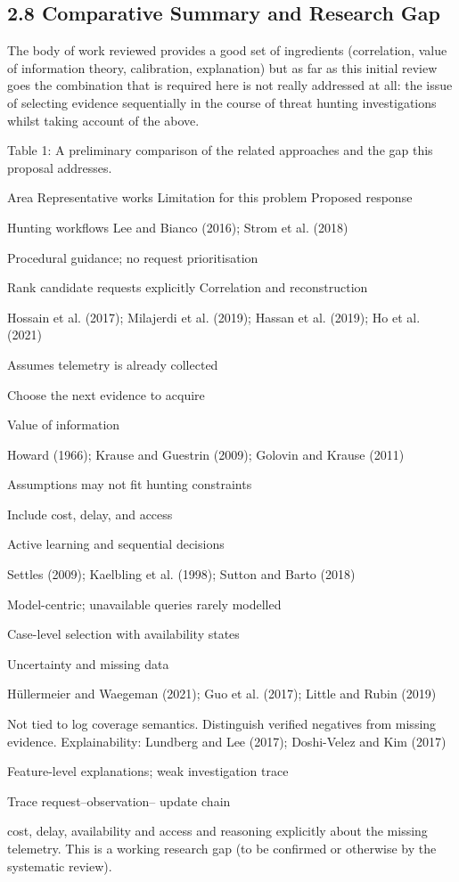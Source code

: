 \documentclass[a4paper,11pt]{article}
\begin{document}
\subsection{2.8 Comparative Summary and Research Gap}
The body of work reviewed provides a good set of ingredients (correlation, value of information theory, calibration, explanation) but as far as this initial review goes the combination that is required here is not really addressed at all: the issue of selecting evidence sequentially in the course of threat hunting investigations whilst taking account of the above.\par
Table 1: A preliminary comparison of the related approaches and the gap this proposal addresses.\par
Area Representative works Limitation for this problem Proposed response\par
Hunting workflows Lee and Bianco (2016); Strom et al. (2018)\par
Procedural guidance; no request prioritisation\par
Rank candidate requests explicitly Correlation and reconstruction\par
Hossain et al. (2017); Milajerdi et al. (2019); Hassan et al. (2019); Ho et al. (2021)\par
Assumes telemetry is already collected\par
Choose the next evidence to acquire\par
Value of information\par
Howard (1966); Krause and Guestrin (2009); Golovin and Krause (2011)\par
Assumptions may not fit hunting constraints\par
Include cost, delay, and access\par
Active learning and sequential decisions\par
Settles (2009); Kaelbling et al. (1998); Sutton and Barto (2018)\par
Model-centric; unavailable queries rarely modelled\par
Case-level selection with availability states\par
Uncertainty and missing data\par
Hüllermeier and Waegeman (2021); Guo et al. (2017); Little and Rubin (2019)\par
Not tied to log coverage semantics. Distinguish verified negatives from missing evidence. Explainability: Lundberg and Lee (2017); Doshi-Velez and Kim (2017)\par
Feature-level explanations; weak investigation trace\par
Trace request–observation– update chain\par
cost, delay, availability and access and reasoning explicitly about the missing telemetry. This is a working research gap (to be confirmed or otherwise by the systematic review).\par
\end{document}
